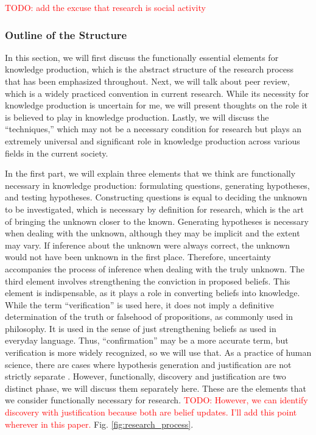 \documentclass{book}
\begin{document}
\textcolor{red}{TODO: add the excuse that research is social activity}

\subsubsection{Outline of the Structure}
In this section, we will first discuss the functionally essential elements for knowledge production, which is the abstract structure of the research process that has been emphasized throughout. Next, we will talk about peer review, which is a widely practiced convention in current research. While its necessity for knowledge production is uncertain for me, we will present thoughts on the role it is believed to play in knowledge production. Lastly, we will discuss the ``techniques,'' which may not be a necessary condition for research but plays an extremely universal and significant role in knowledge production across various fields in the current society.


In the first part, we will explain three elements that we think are functionally necessary in knowledge production: formulating questions, generating hypotheses, and testing hypotheses. Constructing questions is equal to deciding the unknown to be investigated, which is necessary by definition for research, which is the art of bringing the unknown closer to the known. Generating hypotheses is necessary when dealing with the unknown, although they may be implicit and the extent may vary. If inference about the unknown were always correct, the unknown would not have been unknown in the first place. Therefore, uncertainty accompanies the process of inference when dealing with the truly unknown. The third element involves strengthening the conviction in proposed beliefs. This element is indispensable, as it plays a role in converting beliefs into knowledge. While the term ``verification'' is used here, it does not imply a definitive determination of the truth or falsehood of propositions, as commonly used in philosophy. It is used in the sense of just strengthening beliefs as used in everyday language. Thus, ``confirmation'' may be a more accurate term, but verification is more widely recognized, so we will use that. As a practice of human science, there are cases where hypothesis generation and justification are not strictly separate \cite{arabatzis2006inextricability}. However, functionally, discovery and justification are two distinct phase, we will discuss them separately here. These are the elements that we consider functionally necessary for research. \textcolor{red}{TODO: However, we can identify discovery with justification because both are belief updates. I'll add this point wherever in this paper.} Fig. \ref{fig:research_process}.
\end{document}
